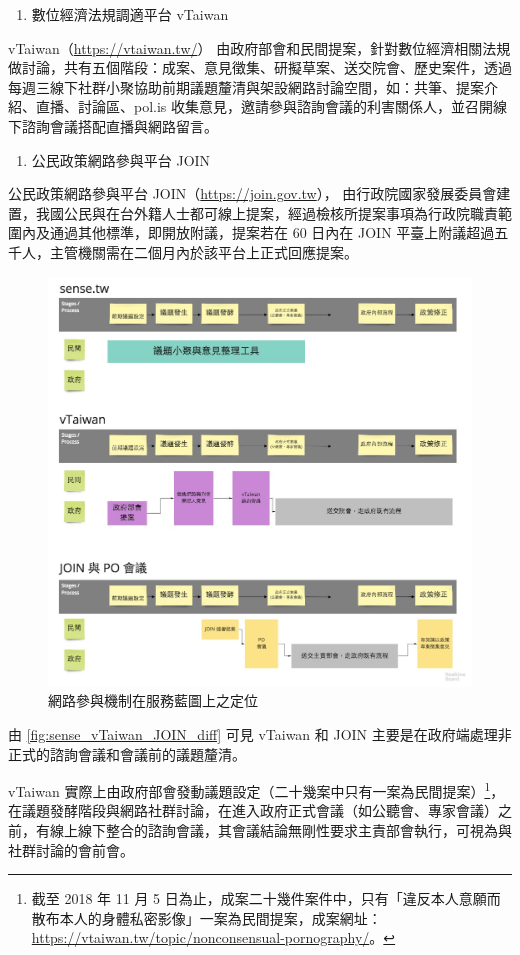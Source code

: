\documentclass[12pt,a4paper]{article}
\begin{document}
\begin{enumerate}
\begin{enumerate}
\item 數位經濟法規調適平台 vTaiwan
\end{enumerate}
vTaiwan（\url{https://vtaiwan.tw/}）
由政府部會和民間提案，針對數位經濟相關法規做討論，共有五個階段：成案、意見徵集、研擬草案、送交院會、歷史案件，透過每週三線下社群小聚協助前期議題釐清與架設網路討論空間，如：共筆、提案介紹、直播、討論區、pol.is 收集意見，邀請參與諮詢會議的利害關係人，並召開線下諮詢會議搭配直播與網路留言。

\begin{enumerate}
\item 公民政策網路參與平台 JOIN
\end{enumerate}
公民政策網路參與平台 JOIN（\url{https://join.gov.tw}）， 由行政院國家發展委員會建置，我國公民與在台外籍人士都可線上提案，經過檢核所提案事項為行政院職責範圍內及通過其他標準，即開放附議，提案若在 60 日內在 JOIN 平臺上附議超過五千人，主管機關需在二個月內於該平台上正式回應提案。

\begin{figure}[htbp]
\centering
\includegraphics[width=.9\linewidth]{./images/sense_vTaiwan_JOIN_diff.jpg}
\caption{\label{fig:org3c2fe4e}
網路參與機制在服務藍圖上之定位}
\end{figure}

由 \ref{fig:sense_vTaiwan_JOIN_diff} 可見 vTaiwan 和 JOIN 主要是在政府端處理非正式的諮詢會議和會議前的議題釐清。

vTaiwan 實際上由政府部會發動議題設定（二十幾案中只有一案為民間提案）\footnote{截至 2018 年 11 月 5 日為止，成案二十幾件案件中，只有「違反本人意願而散布本人的身體私密影像」一案為民間提案，成案網址：\url{https://vtaiwan.tw/topic/nonconsensual-pornography/}。}，在議題發酵階段與網路社群討論，在進入政府正式會議（如公聽會、專家會議）之前，有線上線下整合的諮詢會議，其會議結論無剛性要求主責部會執行，可視為與社群討論的會前會。


\end{enumerate}
\end{document}

